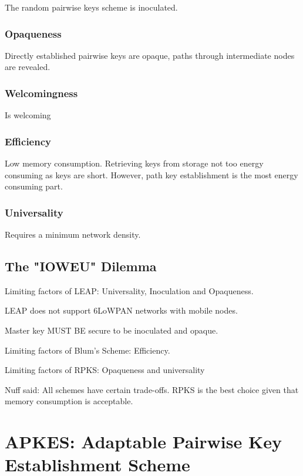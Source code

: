\documentclass[10pt]{article}
\begin{document}
The random pairwise keys scheme is inoculated.

\subsubsection{Opaqueness}

Directly established pairwise keys are opaque, paths through intermediate nodes are revealed.

\subsubsection{Welcomingness}

Is welcoming

\subsubsection{Efficiency}

Low memory consumption. Retrieving keys from storage not too energy consuming as keys are short. However, path key establishment is the most energy consuming part.

\subsubsection{Universality}

Requires a minimum network density.

\subsection{The "IOWEU" Dilemma}

\noindent

Limiting factors of LEAP: Universality, Inoculation and Opaqueness.

LEAP does not support 6LoWPAN networks with mobile nodes.

Master key MUST BE secure to be inoculated and opaque.

Limiting factors of Blum's Scheme: Efficiency.

Limiting factors of RPKS: Opaqueness and universality

Nuff said: All schemes have certain trade-offs. RPKS is the best choice given that memory consumption is acceptable.


\section{APKES: Adaptable Pairwise Key Establishment Scheme}
\end{document}
